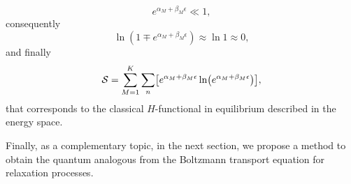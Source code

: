 \begin{equation}
     e^{\alpha_M+\beta_M \epsilon}\ll 1,
\end{equation}
consequently 
\begin{equation}
    \ln(1\mp e^{\alpha_M+\beta_M \epsilon}) \approx \ln 1 \approx 0,
\end{equation}
and finally
\begin{equation}
    \Ss=\sum_{M=1}^{K}\sum_{n}
        \left[
                e^{\alpha_M+\beta_M \epsilon} \ln 
                    \left(
                            e^{\alpha_M+\beta_M \epsilon}
                    \right)
        \right],
\end{equation}
that corresponds to the classical $H$-functional in equilibrium described in the energy space.


Finally, as a complementary topic, in the next section, we propose a method to obtain the quantum analogous from the Boltzmann transport equation for relaxation processes.

